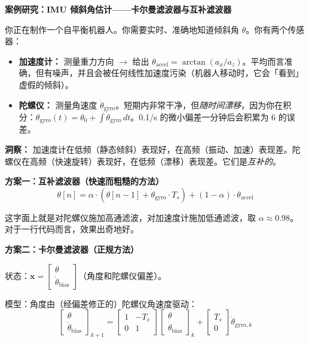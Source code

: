\vspace{0.5em}
\begin{mdframed}[linewidth=1pt, innertopmargin=10pt, innerbottommargin=10pt]
\textbf{案例研究：IMU 倾斜角估计——卡尔曼滤波器与互补滤波器}

\vspace{0.3em}
你正在制作一个自平衡机器人。你需要实时、准确地知道倾斜角 $\theta$。你有两个传感器：

\begin{itemize}[nosep]
    \item \textbf{加速度计：} 测量重力方向 $\to$ 给出 $\theta_{\text{accel}} = \arctan(a_x / a_z)$。平均而言准确，但有噪声，并且会被任何线性加速度污染（机器人移动时，它会「看到」虚假的倾斜）。
    \item \textbf{陀螺仪：} 测量角速度 $\dot{\theta}_{\text{gyro}}$。短期内非常干净，但\textit{随时间漂移}，因为你在积分：$\theta_{\text{gyro}}(t) = \theta_0 + \int \dot{\theta}_{\text{gyro}} \, dt$。0.1\textdegree/s 的微小偏差一分钟后会积累为 6\textdegree{} 的误差。
\end{itemize}

\textbf{洞察：} 加速度计在低频（静态倾斜）表现好，在高频（振动、加速）表现差。陀螺仪在高频（快速旋转）表现好，在低频（漂移）表现差。它们是\textit{互补的}。

\textbf{方案一：互补滤波器（快速而粗糙的方法）}
\[
\theta[n] = \alpha \cdot (\theta[n-1] + \dot{\theta}_{\text{gyro}} \cdot T_s) + (1 - \alpha) \cdot \theta_{\text{accel}}
\]

这字面上就是对陀螺仪施加高通滤波，对加速度计施加低通滤波，取 $\alpha \approx 0.98$。对于一行代码而言，效果出奇地好。

\textbf{方案二：卡尔曼滤波器（正规方法）}

状态：$\mathbf{x} = \begin{bmatrix} \theta \\ \dot{\theta}_{\text{bias}} \end{bmatrix}$（角度和陀螺仪偏差）。

模型：角度由（经偏差修正的）陀螺仪角速度驱动：
\[
\begin{bmatrix} \theta \\ \dot{\theta}_{\text{bias}} \end{bmatrix}_{k+1} =
\begin{bmatrix} 1 & -T_s \\ 0 & 1 \end{bmatrix}
\begin{bmatrix} \theta \\ \dot{\theta}_{\text{bias}} \end{bmatrix}_k +
\begin{bmatrix} T_s \\ 0 \end{bmatrix} \dot{\theta}_{\text{gyro},k}
\]


\end{mdframed}
